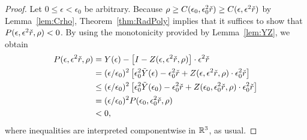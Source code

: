 \begin{proof}
	 Let $0 \leq  \epsilon < \epsilon_0$ be arbitrary.
	 Because $\rho \geq C(\epsilon_0,\epsilon_0^2 \check{r}) \geq C(\epsilon,\epsilon^2 \check{r})$ by Lemma~\ref{lem:Crho},
	Theorem~\ref{thm:RadPoly} implies that it suffices to show that $ P(\epsilon,\epsilon^2 \check{r} ,\rho) <0$. 
	By using the monotonicity provided by Lemma~\ref{lem:YZ}, we obtain
	\begin{alignat*}{1}
		P(\epsilon,\epsilon^2 \check{r} ,\rho) &= Y(\epsilon) 
- \left[ I - Z(\epsilon,\epsilon^2 \check{r},\rho)\right] \cdot \epsilon^2 \check{r} \\
		&=  (\epsilon / \epsilon_0)^{2} \left[ \epsilon_0^2   
		  \tilde{Y}(\epsilon) - \epsilon_0^2 \check{r} 
		+  Z(\epsilon,\epsilon^2 \check{r},\rho) \cdot \epsilon_0^2 \check{r}  \right] \\
		&\leq  (\epsilon / \epsilon_0)^{2} \left[ \epsilon_0^2  
		  \tilde{Y}(\epsilon_0)  - \epsilon_0^2 \check{r} 
   +  Z(\epsilon_0,\epsilon_0^2 \check{r},\rho) \cdot \epsilon_0^2 \check{r}  \right] \\
		&= (\epsilon / \epsilon_0)^{ 2} P(\epsilon_0 , \epsilon_0^2 \check{r},\rho) \\
		& < 0,
	\end{alignat*}
where inequalities are interpreted componentwise in $\mathbb{R}^3$, as usual.
\end{proof}





